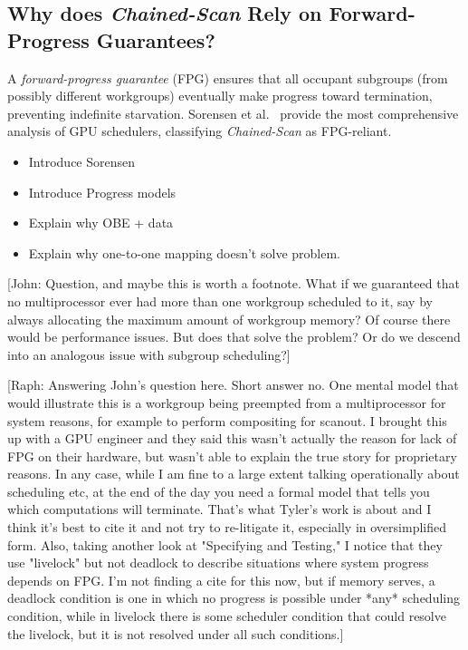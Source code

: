 \documentclass[sigconf]{acmart}
\newcommand{\john}[1]{{\footnotesize\color{cyan}[John: #1]}}
\newcommand{\raph}[1]{{\footnotesize\color{magenta}[Raph: #1]}}
\begin{document}
\subsection{Why does \emph{Chained-Scan} Rely on Forward-Progress Guarantees?}
A \emph{forward-progress guarantee} (FPG) ensures that all occupant subgroups (from possibly different workgroups) eventually make progress toward termination, preventing indefinite starvation. Sorensen et al.~\cite{sorensen2018,sorensen2021} provide the most comprehensive analysis of GPU schedulers, classifying \emph{Chained-Scan} as FPG-reliant.
\begin{itemize}
  \item Introduce Sorensen
  \item Introduce Progress models
  \item Explain why OBE + data
  \item Explain why one-to-one mapping doesn't solve problem.
\end{itemize}

\john{Question, and maybe this is worth a footnote. What if we guaranteed that no multiprocessor ever had more than one workgroup scheduled to it, say by always allocating the maximum amount of workgroup memory? Of course there would be performance issues. But does that solve the problem? Or do we descend into an analogous issue with subgroup scheduling?}

\raph{Answering John's question here. Short answer no. One mental model that would illustrate this is a workgroup being preempted from a multiprocessor for system reasons, for example to perform compositing for scanout. I brought this up with a GPU engineer and they said this wasn't actually the reason for lack of FPG on their hardware, but wasn't able to explain the true story for proprietary reasons. In any case, while I am fine to a large extent talking operationally about scheduling etc, at the end of the day you need a formal model that tells you which computations will terminate. That's what Tyler's work is about and I think it's best to cite it and not try to re-litigate it, especially in oversimplified form. Also, taking another look at "Specifying and Testing," I notice that they use "livelock" but not deadlock to describe situations where system progress depends on FPG. I'm not finding a cite for this now, but if memory serves, a deadlock condition is one in which no progress is possible under *any* scheduling condition, while in livelock there is some scheduler condition that could resolve the livelock, but it is not resolved under all such conditions.}
\end{document}
